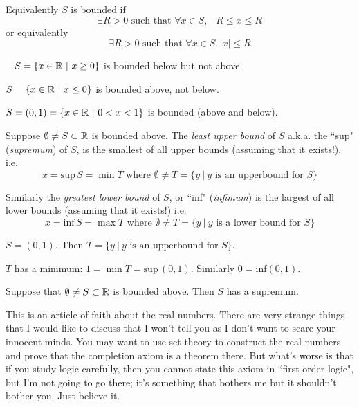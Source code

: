 \documentclass[twoside]{scrartcl}
\begin{document}
Equivalently $S$ is bounded if 
\[\exists R >0 \text{ such that } \forall x \in S, -R \leq x \leq R\]
or equivalently 
\[\exists R >0 \text{ such that } \forall x \in S, |x| \leq R\]\vspace*{2pt}

\begin{examples}~
$S = \{x \in\mathbb{R} ~|~ x \geq 0\}$ is bounded below but not above. 

$S = \{x \in\mathbb{R} ~|~ x \leq 0\}$ is bounded above, not below. 

$S = (0,1) = \{x \in\mathbb{R} ~|~ 0 < x < 1\}$ is bounded (above and below). 	
\end{examples}

\begin{definition}
Suppose $\emptyset \neq S\subset \mathbb{R}$ is bounded above. The \emph{least upper bound} of $S$ a.k.a. the ``sup" (\emph{supremum}) of $S$, is the smallest of all upper bounds (assuming that it exists!), i.e.
 \[x = \mathrm{sup}\, S = \min T\text{ where }\emptyset \neq T = \{y ~|~ y \text{ is an upperbound for } S\}\]
 
 Similarly the \emph{greatest lower bound} of $S$, or ``inf" (\emph{infimum}) is the largest of all lower bounds (assuming that it exists!) i.e. 
 \[x = \mathrm{inf}\, S = \max T\text{ where }\emptyset \neq T = \{y~|~ y \text{ is a lower bound for } S \}\]
\end{definition}\vspace*{5pt}

\begin{example}
$S = (0,1)$. Then $T = \{y ~|~ y \text{ is an upperbound for } S\}$. 

$T$ has a minimum: $1 = \min T = \mathrm{sup}\, (0,1)$. Similarly $0 = \mathrm{inf}(0,1)$. 
\end{example}




\begin{axiom}[Completeness of $\RR$]
Suppose that $\emptyset \neq S \subset \mathbb{R}$ is bounded above. Then $S$ has a supremum.
\end{axiom}

This is an article of faith about the real numbers. There are very strange things that I would like to discuss that I won't tell you as I don't want to scare your innocent minds. You may want to use set theory to construct the real numbers and prove that the completion axiom is a theorem there. But what's worse is that if you study logic carefully, then you cannot state this axiom in ``first order logic", but I'm not going to go there; it's something that bothers me but it shouldn't bother you. Just believe it.\\
\end{document}
